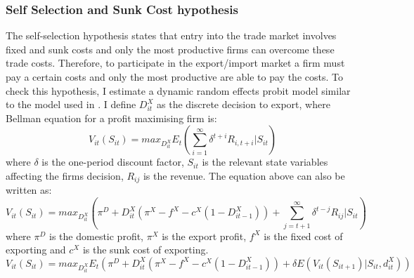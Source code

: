 \documentclass[11pt]{article}
\begin{document}
\subsubsection{Self Selection and Sunk Cost hypothesis}
The self-selection hypothesis states that entry into the trade market
involves fixed and sunk costs and only the most productive firms can
overcome these trade costs. Therefore, to participate in the
export/import market a firm must pay a certain costs and only the most
productive are able to pay the costs. To check this hypothesis, I
estimate a dynamic random effects probit model similar to the model used
in \cite{roberts1997decision}. I define $D_{it}^{X}$ as the discrete
decision to export, where
 Bellman equation for a profit maximising firm is:
\begin{equation}
V_{it}(S_{it})= max_{D_{it}^{X}}E_{t}(\sum_{i=1}^{\infty} \delta^{t+i}R_{i,t+i}|S_{it})
\end{equation}
 where $\delta$ is the one-period discount factor, $S_{it}$ is the
 relevant state variables affecting the firms decision, $R_{ij}$ is
 the revenue. The equation above can also be written as:
\begin{equation}
V_{it}(S_{it})= max_{D_{it}^{X}}(\pi^{D} + D_{it}^{X}(\pi^{X}- f^{X} -
c^{X}(1-D_{it-1}^{X}))  + \sum_{j=t+1}^{\infty} \delta^{t-j}R_{ij}|S_{it})
\end{equation}
where $\pi^{D}$ is the domestic profit, $\pi^{X}$ is the export
profit, $f^{X}$ is the fixed cost of exporting and $c^{X}$ is the sunk
cost of exporting. 
\begin{equation}
V_{it}(S_{it})= max_{D_{it}^{X}}E_{t}(\pi^{D} + D_{it}^{X}(\pi^{X}- f^{X} -
c^{X}(1-D_{it-1}^{X}))  + \delta E (V_{it}(S_{it+1})|S_{it}, d_{it}^{X}))
\end{equation}
\end{document}
